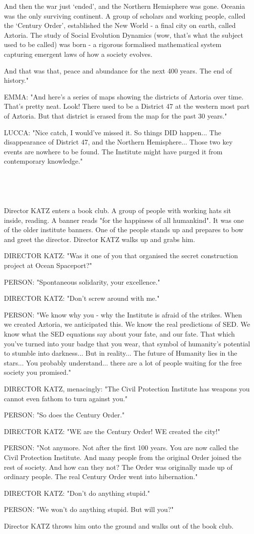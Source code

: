 \documentclass[11pt]{article}
\begin{document}
And then the war just `ended', and the Northern Hemisphere was gone.
Oceania was the only surviving continent.
A group of scholars and working people, called the `Century Order', established the New World - a final city on earth, called Aztoria.
The study of Social Evolution Dynamics (wow, that's what the subject used to be called) was born - a rigorous formalised mathematical system capturing emergent laws of how a society evolves.

And that was that, peace and abundance for the next 400 years. 
The end of history."

EMMA: "And here's a series of maps showing the districts of Aztoria over time. 
That's pretty neat.
Look! There used to be a District 47 at the western most part of Aztoria.
But that district is erased from the map for the past 30 years."

LUCCA: "Nice catch, I would've missed it. 
So things DID happen...
The disappearance of District 47, and the Northern Hemisphere...
Those two key events are nowhere to be found.
The Institute might have purged it from contemporary knowledge."

\ 

\ 

Director KATZ enters a book club.
A group of people with working hats sit inside, reading.
A banner reads "for the happiness of all humankind". 
It was one of the older institute banners.
One of the people stands up and prepares to bow and greet the director.
Director KATZ walks up and grabs him.

DIRECTOR KATZ: "Was it one of you that organised the secret construction project at Ocean Spaceport?"

PERSON: "Spontaneous solidarity, your excellence."

DIRECTOR KATZ: "Don't screw around with me."

PERSON: "We know why you - why the Institute is afraid of the strikes.
When we created Aztoria, we anticipated this. 
We know the real predictions of SED.
We know what the SED equations say about your fate, and our fate.
That which you've turned into your badge that you wear, that symbol of humanity's potential to stumble into darkness...
But in reality... The future of Humanity lies in the stars...
You probably understand... there are a lot of people waiting for the free society you promised."

DIRECTOR KATZ, menacingly: "The Civil Protection Institute has weapons you cannot even fathom to turn against you."

PERSON: "So does the Century Order."

DIRECTOR KATZ: "WE are the Century Order! 
WE created the city!"

PERSON: "Not anymore. Not after the first 100 years.
You are now called the Civil Protection Institute.
And many people from the original Order joined the rest of society.
And how can they not? 
The Order was originally made up of ordinary people.
The real Century Order went into hibernation."

DIRECTOR KATZ: "Don't do anything stupid."

PERSON: "We won't do anything stupid.
But will you?"

Director KATZ throws him onto the ground and walks out of the book club.
\end{document}
